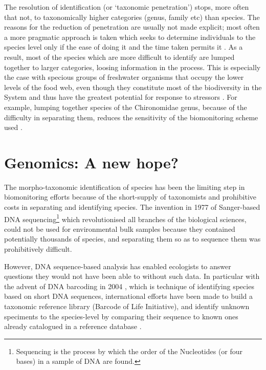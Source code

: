 The resolution of identification (or `taxonomic penetration') stops, more often that not, to taxonomically higher categories (genus, family etc) than species. The reasons for the reduction of penetration are usually not made explicit; most often a more pragmatic approach is taken which seeks to determine individuals to the species level only if the ease of doing it and the time taken permits it \cite{cranston_biomonitoring_1990}. As a result, most of the species which are more difficult to identify are lumped together to larger categories, loosing information in the process. This is especially the case with specious groups of freshwater organisms that occupy the lower levels of the food web, even though they constitute most of the biodiversity in the System and thus have the greatest potential for response to stressors \cite{woodward_biomonitoring_21st}. For example, lumping together species of the Chironomidae genus, because of the difficulty in separating them, reduces the sensitivity of the biomonitoring scheme used \cite{ruse_classification_2010}.



\section{Genomics: A new hope?}
The morpho-taxonomic identification of species has been the limiting step in biomonitoring efforts because of the short-supply of taxonomists and prohibitive costs in separating and identifying species. The invention in 1977 of Sanger-based DNA sequencing\footnote{Sequencing is the process by which the order of the Nucleotides (or four bases) in a sample of DNA are found.} which revolutionised all branches of the biological sciences, could not be used for environmental bulk samples because they contained potentially thousands of species, and separating them so as to sequence them was prohibitively difficult. 

However, DNA sequence-based analysis has enabled ecologists to answer questions they would not have been able to without such data. In particular with the advent of DNA barcoding in 2004 \cite{hebert_paul_d._n._biological_2003}, which is technique of identifying species based on short DNA sequences, international efforts have been made to build a taxonomic reference library (Barcode of Life Initiative), and identify unknown speciments to the species-level by comparing their sequence to known ones already catalogued in a reference database \cite{savolainen_vincent_towards_2005}. 

